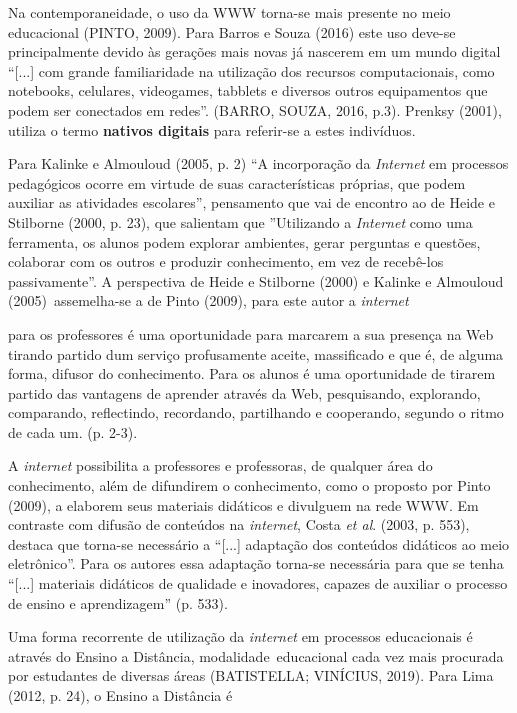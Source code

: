 \documentclass{IFNMG}
\begin{document}
Na contemporaneidade, o uso da WWW torna-se mais presente no meio educacional (PINTO, 2009). Para Barros e Souza (2016) este uso deve-se principalmente devido às gerações mais novas já nascerem em um mundo digital “[...] com grande familiaridade na utilização dos recursos computacionais, como notebooks, celulares, videogames, tabblets e diversos outros equipamentos que podem ser conectados em redes”. (BARRO, SOUZA, 2016, p.3). Prenksy (2001), utiliza o termo \textbf{nativos digitais} para referir-se a estes indivíduos.

Para Kalinke e Almouloud (2005, p. 2) “A incorporação da \textit{Internet} em processos pedagógicos ocorre em virtude de suas características próprias, que podem auxiliar as atividades escolares”, pensamento que vai de encontro ao de Heide e Stilborne (2000, p. 23), que salientam que ”Utilizando a \textit{Internet} como uma ferramenta, os alunos podem explorar ambientes, gerar perguntas e questões, colaborar com os outros e produzir conhecimento, em vez de recebê-los passivamente”. A perspectiva de Heide e Stilborne (2000) e Kalinke e Almouloud (2005) assemelha-se a de Pinto (2009), para este autor a \textit{internet} 

\begin{CitacaoLonga} 
para os professores é uma oportunidade para marcarem a sua presença na Web tirando partido dum serviço profusamente aceite, massificado e que é, de alguma forma, difusor do conhecimento. Para os alunos é uma oportunidade de tirarem partido das vantagens de aprender através da Web, pesquisando, explorando, comparando, reflectindo, recordando, partilhando e cooperando, segundo o ritmo de cada um. (p. 2-3).
\end{CitacaoLonga}

A \textit{internet} possibilita a professores e professoras, de qualquer área do conhecimento, além de difundirem o conhecimento, como o proposto por Pinto (2009), a elaborem seus materiais didáticos e divulguem na rede WWW. Em contraste com difusão de conteúdos na \textit{internet}, Costa \textit{et al}. (2003, p. 553), destaca que torna-se necessário a “[...] adaptação dos conteúdos didáticos ao meio eletrônico”. Para os autores essa adaptação torna-se necessária para que se tenha  “[...] materiais didáticos de qualidade e inovadores, capazes de auxiliar o processo de ensino e aprendizagem” (p. 533).

Uma forma recorrente de utilização da \textit{internet} em processos educacionais é através do Ensino a Distância, modalidade educacional cada vez mais procurada por estudantes de diversas áreas (BATISTELLA; VINÍCIUS, 2019). Para Lima (2012, p. 24), o Ensino a Distância é
\end{document}
